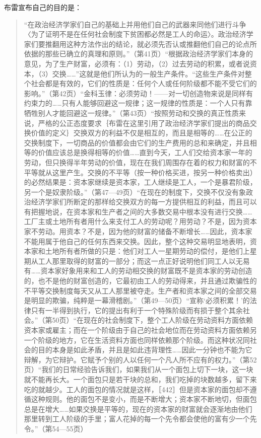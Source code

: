 布雷宣布自己的目的是：

\begin{quote}{“在政治经济学家们自己的基础上并用他们自己的武器来同他们进行斗争〈为了证明不是在任何社会制度下贫困都必然是工人的命运〉。政治经济学家们要推翻用这种方法作出的结论，就必须先否认或推翻他们自己的论点所依据的那些已确立的真理和原则。”（第41页）“根据政治经济学家们本身的意见，为了生产财富，必须有：（1）劳动，（2）过去劳动的积累，或者说资本，（3）交换……”这就是他们所认为的一般生产条件。“这些生产条件对整个社会都是有效的，它们的性质是：任何个人或任何阶级都不能不受它们的影响。”（第42页）“金科玉律：必须劳动！——对一切创造物来说是同样有约束力的……只有人能够回避这一规律；这一规律的性质是：一个人只有靠牺牲别人才能回避这一规律。”（第43页）“按照劳动和交换的真正性质来说，严格的公正态度要求｛布雷在这里引用了政治经济学家们提出的商品交换价值的定义｝交换双方的利益不仅是相互的，而且是相等的……在公正的交换制度下，一切商品的价值都会由它们的生产费用的总和来确定，并且相等的价值应该总是换得相等的价值……直到今天，工人们交给资本家一年的劳动，但只换得半年劳动的价值，现在在我们周围存在着的权力和财富的不平等就从这里产生。交换的不平等（按一种价格买进，按另一种价格卖出）的必然结果是：资本家继续是资本家，工人继续是工人，一个是暴君阶级，另一个是奴隶阶级。”（第47—49页）“在现在的制度下，交换不仅没有象政治经济学家们所断定的那样给交换双方的每一方提供相互的利益，而且可以有把握地说，在资本家和生产者之间的大多数交易中根本没有进行交换……工厂主或土地所有者用什么来支付工人的劳动呢？用劳动？不是，因为资本家不劳动。用资本？不是，因为他的财富的储备不断增长……因此，资本家不能用属于他自己的任何东西来交换。因此，整个这种交易明显地表明，资本家和土地所有者所做的只是：他们对工人一星期劳动的偿付，是他们上星期从工人那里取得的财富的一部分；而这一点正好说明他们同工人以无易有……资本家好象用来和工人的劳动相交换的财富既不是资本家的劳动创造的，也不是他的财富创造的，它最初由工人的劳动得来，并且通过欺骗性的不平等交换制度每天又从工人那里被夺走。生产者和资本家之间的全部交易是明显的欺骗，纯粹是一幕滑稽剧。”（第49—50页）“宣称‘必须积累！’的法律只有一半得到执行，它的提出有利于一个特殊阶级而有损于整个其余社会。”（第50页）“在现在的社会制度下，整个工人阶级在劳动资料方面依赖资本家或雇主；而在一个阶级由于自己的社会地位而在劳动资料方面依赖另一个阶级的地方，它在生活资料方面也同样依赖那个阶级。而这种状况同社会的目的本身是如此矛盾，并且是如此违背理性……因此一分钟也不能为它辩解，为它辩护。它赋予个别的人以任何一个凡人所不应有的权力。”（第52页）“我们的日常经验告诉我们，如果我们从一个面包上切下一块，这一块就不能再长大。一个面包只是若干块的总和，我们吃掉的块数越多，留下来吃的就越少。工人的面包的情况就是这样，［442］但是资本家的面包却不遵循这种规则。他的面包不是变小，而是不断增大；资本家不断地切，但面包总是在增大……如果交换是平等的，现在的资本家的财富就会逐渐地由他们那里转到工人阶级的手里；富人花掉的每一个先令都会使他的富有少一个先令。”（第54—55页）}\end{quote}

